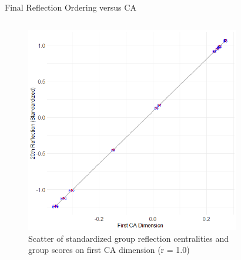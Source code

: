 \documentclass[
  ignorenonframetext,
]{beamer}
\begin{document}
\begin{frame}{Final Reflection Ordering versus CA}
\protect\hypertarget{final-reflection-ordering-versus-ca-3}{}
\begin{columns}[T]
\begin{column}{0.5\textwidth}
\begin{figure}

{\centering \includegraphics{Plots/g-ca-ref-corr-sw.png}

}

\caption{Scatter of standardized group reflection centralities and group
scores on first CA dimension (r = 1.0)}

\end{figure}
\end{column}

\begin{column}{0.5\textwidth}
\begin{figure}


\end{figure}
\end{column}
\end{columns}
\end{frame}
\end{document}
